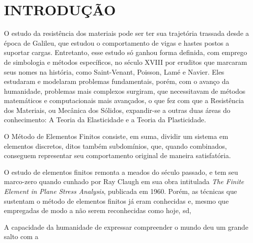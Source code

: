 

\chapter{INTRODUÇÃO}

O estudo da resistência dos materiais pode ser ter sua trajetória trassada desde a época de Galileu, que estudou o comportamento de vigas e hastes postos a suportar cargas. Entretanto, esse estudo só ganhou forma definida, com emprego de simbologia e métodos específicos, no século XVIII por eruditos que marcaram seus nomes na história, como Saint-Venant, Poisson, Lamé e Navier. Eles estudaram e modelaram problemas fundamentais, porém, com o avanço da humanidade, problemas mais complexos surgiram, que necessitavam de métodos matemáticos e computacionais mais avançados, o que fez com que a Resistência dos Materiais, ou Mecânica dos Sólidos, expandir-se a outras duas áreas do conhecimento: A Teoria da Elasticidade e a Teoria da Plasticidade. \cite{Hibbeler}






O Método de Elementos Finitos consiste, em suma, dividir um sistema em elementos discretos, ditos também subdomínios, que, quando combinados, conseguem representar seu comportamento original de maneira satisfatória. \cite{Bittencourt}

O estudo de elementos finitos remonta a meados do século passado, e tem seu marco-zero quando cunhado por Ray Claugh em sua obra intitulada \textit{The Finite Element in Plane Stress Analysis}, publicada em 1960. Porém, as técnicas que sustentam o método de elementos finitos já eram conhecidas e, mesmo que empregadas de modo a não serem reconhecidas como hoje, sd,  \cite{Azevedo}

A capacidade da humanidade de expressar compreender o mundo deu um grande salto com a 